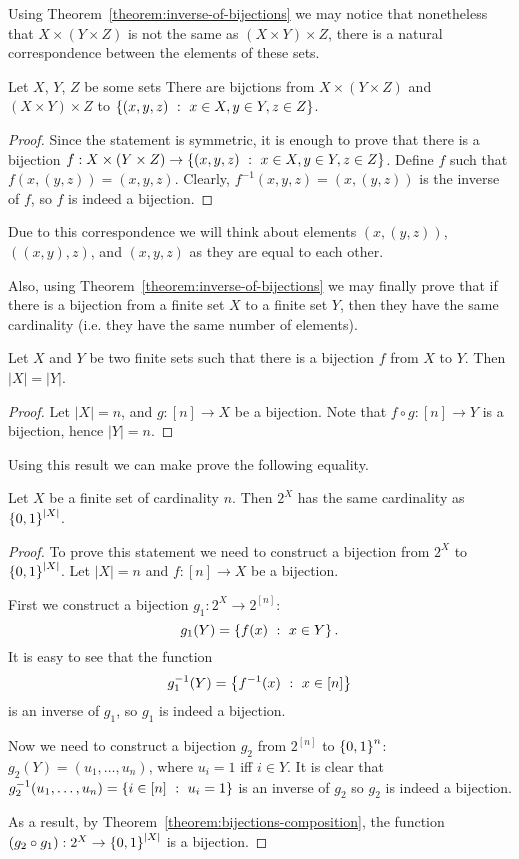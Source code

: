 Using Theorem~\ref{theorem:inverse-of-bijections} we may notice that
nonetheless that $X \times (Y \times Z)$ is not the same as
$(X \times Y) \times Z$, there is a natural correspondence between the elements
of these sets.
\begin{theorem}
  Let $X$, $Y$, $Z$ be some sets
  There are bijctions from $X \times (Y \times Z)$ and
  $(X \times Y) \times Z$ to $\set[x \in X, y \in Y, z \in Z]{(x, y, z)}$.
\end{theorem}
\begin{proof}
  Since the statement is symmetric, it is enough to prove that there is
  a bijection $f : X \times (Y \times Z) \to
  \set[x \in X, y \in Y, z \in Z]{(x, y, z)}$. Define $f$ such that
  $f(x, (y, z)) = (x, y, z)$.
  Clearly, $f^{-1}(x, y, z) = (x, (y, z))$ is the inverse of $f$, so $f$ is
  indeed a bijection.
\end{proof}
Due to this correspondence we will think about elements $(x, (y, z))$,
$((x, y), z)$, and $(x, y, z)$ as they are equal to each other.

Also, using Theorem~\ref{theorem:inverse-of-bijections} we may finally prove
that if there is a bijection from a finite set $X$ to a finite set $Y$, then
they have the same cardinality (i.e. they have the same number of elements).
\begin{theorem}
  Let $X$ and $Y$ be two finite sets such that there is a bijection $f$ from
  $X$ to $Y$. Then $|X| = |Y|$.
\end{theorem}
\begin{proof}
  Let $|X| = n$, and $g : [n] \to X$ be a bijection.
  Note that $f \circ g : [n] \to Y$ is a bijection, hence $|Y| = n$.
\end{proof}

Using this result we can make prove the following equality.
\begin{corollary}
\label{corollary:power-set-and-set-of-binary-strings}
  Let $X$ be a finite set of cardinality $n$. Then $2^X$ has the same
  cardinality as $\set{0, 1}^{|X|}$.
\end{corollary}
\begin{proof}
  To prove this statement we need to construct a bijection from $2^X$ to
  $\set{0, 1}^{|X|}$. Let $|X| = n$ and $f : [n] \to X$ be a bijection.

  First we construct a bijection $g_1 : 2^X \to 2^{[n]}$:
  \[
    g_1(Y) = \set[x \in Y]{f(x)}.
  \] It is easy to see that the function
  \[
    g^{-1}_1(Y) = \set[{x \in [n]}]{f^{-1}(x)}
  \]
  is an inverse of $g_1$, so $g_1$ is indeed a bijection.

  Now we need to construct a bijection $g_2$ from $2^{[n]}$ to $\set{0, 1}^n$:
  $g_2(Y) = (u_1, \dots, u_n)$, where $u_i = 1$ iff $i \in Y$. It is clear
  that $g^{-1}_2(u_1, \dots, u_n) = \set[u_i = 1]{i \in [n]}$ is an inverse
  of $g_2$ so $g_2$ is indeed a bijection.

  As a result, by Theorem~\ref{theorem:bijections-composition}, the function
  $(g_2 \circ g_1) : 2^X \to \set{0, 1}^{|X|}$ is a bijection.
\end{proof}

